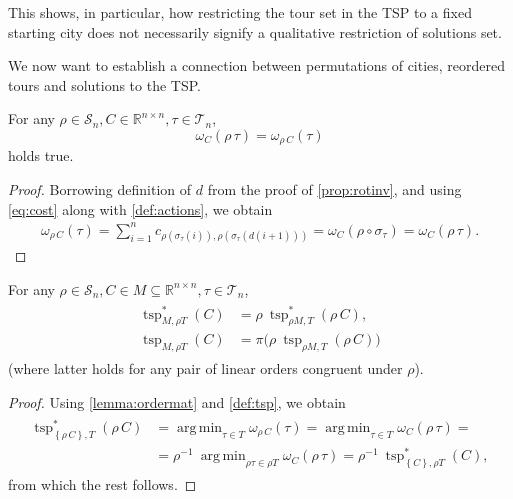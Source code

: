 \documentclass[index=totoc,bibliography=totoc]{scrartcl}
\newcommand{\annotation}[1]{\marginpar{\small\itshape\color{green}#1}}
\DeclareMathOperator*{\argmin}{arg\,min}
\numberwithin{equation}{section}
\numberwithin{figure}{section}
\numberwithin{table}{section}
\begin{document}
This shows, in particular, how restricting the tour set in the TSP to a
fixed starting city does not necessarily signify a qualitative restriction
of solutions set.

We now want to establish a connection between permutations of cities,
reordered tours and solutions to the TSP.

\begin{lemma}
\label{lemma:ordermat}
  For any $\rho \in \mathcal{S}_n, C \in \mathbb{R}^{n \times n}, \tau \in \mathcal{T}_n$,
  \[
    \omega_C\left(\rho\,\tau\right) = \omega_{\rho\,C}\left(\tau\right)
  \]
  holds true.
\end{lemma}
\begin{proof}
  Borrowing definition of $d$ from the proof of \cref{prop:rotinv},
  and using \cref{eq:cost} along with \cref{def:actions}, we obtain
  \begin{align*}
    \omega_{\rho\,C}\left(\tau\right) =
    \sum_{i=1}^n c_{\rho\left(\sigma_\tau\left(i\right)\right),
                    \rho\left(\sigma_\tau\left(d\left(i+1\right)\right)\right)} =
    \omega_C\left(\rho \circ \sigma_\tau\right) =
    \omega_C\left(\rho\,\tau\right).
  \end{align*}
\end{proof}

\begin{corollary}
\label{cor:reorder}
  For any $\rho \in \mathcal{S}_n, C \in M \subseteq \mathbb{R}^{n \times n},
  \tau \in \mathcal{T}_n$,
  \begin{align*}
  \begin{split}
    \operatorname{tsp}^\ast_{M,\rho T}\left(C\right)
    & =
    \rho \: \operatorname{tsp}^\ast_{\rho M,T}\left(\rho\,C\right),
    \\
    \operatorname{tsp}_{M,\rho T}\left(C\right)
    & =
    \pi\big( \rho \: \operatorname{tsp}_{\rho M,T}\left(\rho\,C\right) \big)
  \end{split}
  \end{align*}
  (where latter holds for any pair of linear orders congruent under $\rho$).
\end{corollary}
\begin{proof}
  Using \cref{lemma:ordermat} and \cref{def:tsp}, we obtain
  \begin{align*}
    \begin{split}
    \operatorname{tsp}^\ast_{\left\{\rho\,C\right\},T}\left(\rho\,C\right)
    & =
    \argmin_{\tau \in T} \omega_{\rho\,C}\left(\tau\right) =
    \argmin_{\tau \in T} \omega_{C}\left(\rho\,\tau\right) =
    \\
    & =
    \rho^{-1} \: \argmin_{\rho\tau \in \rho T} \omega_{C}\left(\rho\,\tau\right) =
    \rho^{-1} \: \operatorname{tsp}^\ast_{\left\{C\right\},\rho T}\left(C\right),
    \end{split}
  \end{align*}
  from which the rest follows.
\end{proof}
\end{document}

